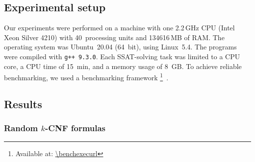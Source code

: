 \subsection{Experimental setup}
Our experiments were performed on a machine with
one 2.2\,GHz CPU (Intel Xeon Silver 4210) with 40~processing units and 134616\,MB of RAM.
The operating system was Ubuntu~20.04 (64~bit),
using Linux~5.4.
The programs were compiled with \texttt{g++ 9.3.0}.
Each SSAT-solving task was limited to a CPU core,
a CPU time of \SI{15}{min},
and a memory usage of \SI{8}{GB}.
To achieve reliable benchmarking,
we used a benchmarking framework \benchexec\footnote{Available at: \url{\benchexecurl}}~\cite{Benchmarking-STTT}.

\subsection{Results}

\subsubsection{Random $k$-CNF formulas}

